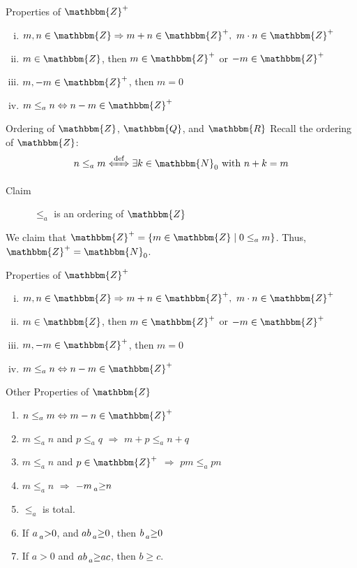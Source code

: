 \documentclass[10pt]{extarticle}
\newcommand{\N}{\mathbbm{N}}
\newcommand{\Q}{\mathbbm{Q}}
\newcommand{\Z}{\mathbbm{Z}}
\newcommand{\R}{\mathbbm{R}}
\begin{document}
  \begin{problem}{Properties of $\Z^+$}
    \begin{enumerate}[(i)]
      \item $m,n\in \Z\Rightarrow m+n\in\Z^+,~m\cdot n\in \Z^+$
      \item $m\in \Z$, then $m\in \Z^+$ or $-m\in\Z^+$
      \item $m,-m\in \Z^+$, then $m=0$
      \item $m\leq_a n \Leftrightarrow n-m\in\Z^+$
    \end{enumerate}
  \end{problem}
  \begin{problem}{Ordering of $\Z$, $\Q$, and $\R$}
    Recall the ordering of $\Z$:
    \[
      n\leq_a m \xLeftrightarrow{\text{def}} \exists k\in \N_0~\text{with } n+k=m
    \] 
    \begin{description}
      \item[Claim] $\leq_a$ is an ordering of $\Z$
    \end{description}
    We claim that $\Z^+ = \{m\in\Z\mid 0\leq_a m\}$. Thus, $\Z^+ = \N_0$.
    \begin{problem}{Properties of $\Z^+$}
      \begin{enumerate}[(i)]
        \item $m,n\in \Z\Rightarrow m+n\in\Z^+,~m\cdot n\in \Z^+$
        \item $m\in \Z$, then $m\in \Z^+$ or $-m\in\Z^+$
        \item $m,-m\in \Z^+$, then $m=0$
        \item $m\leq_a n \Leftrightarrow n-m\in\Z^+$
      \end{enumerate}
    \end{problem}
    \begin{problem}{Other Properties of $\Z$}
      \begin{enumerate}[(\arabic*)]
        \item $n\leq_a m\Leftrightarrow m-n\in\Z^+$
        \item $m\leq_a n$ and $p\leq_a q$ $\Rightarrow$ $m+p \leq_a n+q$
        \item $m\leq_a n$ and $p\in \Z^+$ $\Rightarrow$ $pm\leq_a pn$
        \item $m\leq_a n$ $\Rightarrow$ $-m \prescript{}{a}\geq n$
        \item $\leq_a$ is total.
        \item If $a \prescript{}{a}>0$, and $ab \prescript{}{a}\geq 0$, then $b\prescript{}{a}\geq 0$
        \item If $a > 0$ and $ab \prescript{}{a}\geq ac$, then $b\geq c$.

\end{enumerate}
\end{problem}
\end{problem}
\end{document}
